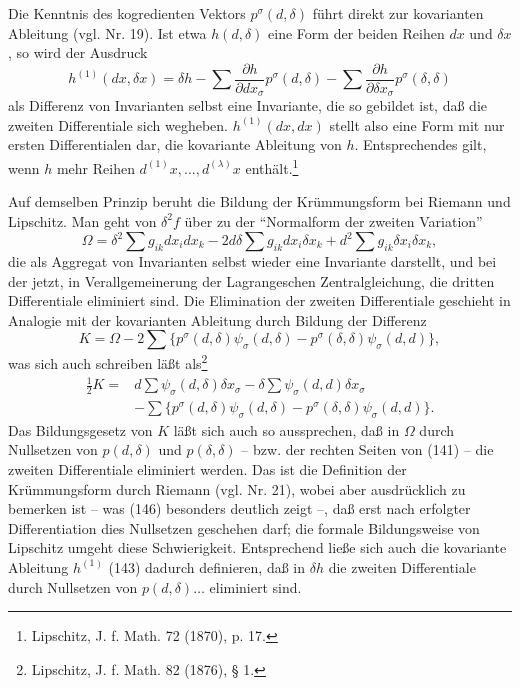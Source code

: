 \documentclass[11pt]{article}
\begin{document}
Die Kenntnis des kogredienten Vektors $p^\sigma(d,\delta)$ führt direkt zur kovarianten Ableitung (vgl. Nr. 19). Ist etwa $h(d,\delta)$ eine Form der beiden Reihen $dx$ und $\delta x$, so wird der Ausdruck
\begin{equation}
 h^{(1)}(dx,\delta x)=\delta h-
 \sum\frac{\partial h}{\partial dx_\sigma}p^\sigma(d,\delta)-
 \sum\frac{\partial h}{\partial \delta x_\sigma}p^\sigma(\delta,\delta)
\tag{143}
\end{equation}
als Differenz von Invarianten selbst eine Invariante, die so gebildet ist, daß die zweiten Differentiale sich wegheben. $h^{(1)}(dx,dx)$ stellt also eine Form mit nur ersten Differentialen dar, die kovariante Ableitung von $h$. Entsprechendes gilt, wenn $h$ mehr Reihen $d^{(1)}x,\ldots,d^{(\lambda)}x$ enthält.\footnote{Lipschitz, J. f. Math. 72 (1870), p. 17.}

Auf demselben Prinzip beruht die Bildung der Krümmungsform bei Riemann und Lipschitz. Man geht von $\delta^2 f$ über zu der ``Normalform der zweiten Variation''
\begin{equation}
 \Omega=\delta^2\sum g_{ik}dx_i dx_k
 -2d\delta\sum g_{ik}dx_i\delta x_k
 +d^2\sum g_{ik}\delta x_i\delta x_k,
\tag{144}
\end{equation}
die als Aggregat von Invarianten selbst wieder eine Invariante darstellt, und bei der jetzt, in Verallgemeinerung der Lagrangeschen Zentralgleichung, die dritten Differentiale eliminiert sind. Die Elimination der zweiten Differentiale geschieht in Analogie mit der kovarianten Ableitung durch Bildung der Differenz
\begin{equation}
 K=\Omega-2\sum\{p^\sigma(d,\delta)\psi_\sigma(d,\delta)-p^\sigma(\delta,\delta)\psi_\sigma(d,d)\},
\tag{145}
\end{equation}
was sich auch schreiben läßt als\footnote{Lipschitz, J. f. Math. 82 (1876), § 1.}
\begin{equation}
\begin{aligned}
 \frac12 K={}&d\sum\psi_\sigma(d,\delta)\delta x_\sigma
 -\delta\sum\psi_\sigma(d,d)\delta x_\sigma\\
 &-\sum\{p^\sigma(d,\delta)\psi_\sigma(d,\delta)-p^\sigma(\delta,\delta)\psi_\sigma(d,d)\}.
\end{aligned}
\tag{146}
\end{equation}
Das Bildungsgesetz von $K$ läßt sich auch so aussprechen, daß in $\Omega$ durch Nullsetzen von $p(d,\delta)$ und $p(\delta,\delta)$ -- bzw. der rechten Seiten von (141) -- die zweiten Differentiale eliminiert werden. Das ist die Definition der Krümmungsform durch Riemann (vgl. Nr. 21), wobei aber ausdrücklich zu bemerken ist -- was (146) besonders deutlich zeigt --, daß erst nach erfolgter Differentiation dies Nullsetzen geschehen darf; die formale Bildungsweise von Lipschitz umgeht diese Schwierigkeit. Entsprechend ließe sich auch die kovariante Ableitung $h^{(1)}$ (143) dadurch definieren, daß in $\delta h$ die zweiten Differentiale durch Nullsetzen von $p(d,\delta)\ldots$ eliminiert sind.
\end{document}
